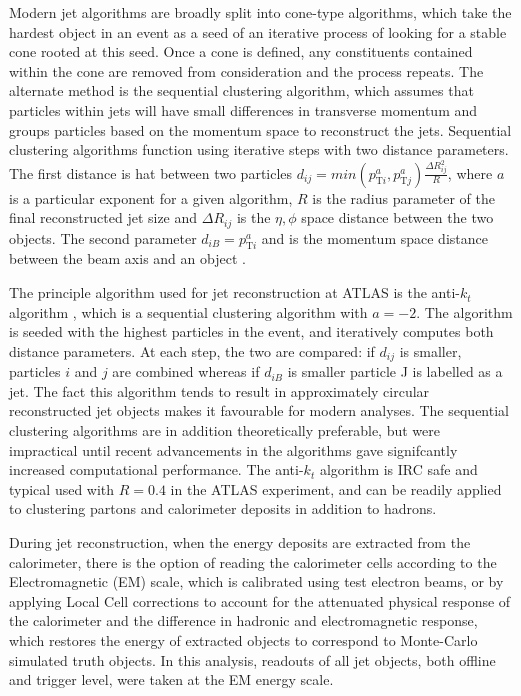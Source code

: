 	Modern jet algorithms are broadly split into cone-type algorithms, which take the hardest object in an event as a seed of an iterative process of looking for a stable cone rooted at this seed. Once a cone is defined, any constituents contained within the cone are removed from consideration and the process repeats. The alternate method is the sequential clustering algorithm, which assumes that particles within jets will have small differences in transverse momentum and groups particles based on the momentum space to reconstruct the jets. Sequential clustering algorithms function using iterative steps with two distance parameters. The first distance is hat between two particles $d_{ij} = min(p_{\text{T}i}^a, p_{\text{T}j}^a)\frac{\Delta R_{ij}^2}{R}$, where $a$ is a particular exponent for a given algorithm, $R$ is the radius parameter of the final reconstructed jet size and $\Delta R_{ij}$ is the $\eta, \phi$ space distance between the two objects. The second parameter $d_{iB} = p_{\text{T}i}^a$ and is the momentum space distance between the beam axis and an object \cite{jetreco}.

	The principle algorithm used for jet reconstruction at ATLAS is the anti-$k_t$ algorithm \cite{antikt}, which is a sequential clustering algorithm with $a=-2$. The algorithm is seeded with the highest \pt particles in the event, and iteratively computes both distance parameters. At each step, the two are compared: if $d_{ij}$ is smaller, particles $i$ and $j$ are combined whereas if $d_{iB}$ is smaller particle J is labelled as a jet. The fact this algorithm tends to result in approximately circular reconstructed jet objects makes it favourable for modern analyses. The sequential clustering algorithms are in addition theoretically preferable, but were impractical until recent advancements in the algorithms gave signifcantly increased computational performance. The anti-$k_t$ algorithm is IRC safe and typical used with $R=0.4$ in the ATLAS experiment, and can be readily applied to clustering partons and calorimeter deposits in addition to hadrons.

	During jet reconstruction, when the energy deposits are extracted from the calorimeter, there is the option of reading the calorimeter cells according to the Electromagnetic (EM) scale, which is calibrated using test electron beams, or by applying Local Cell corrections to account for the attenuated physical response of the calorimeter and the difference in hadronic and electromagnetic response, which restores the energy of extracted objects to correspond to Monte-Carlo simulated truth objects. In this analysis, readouts of all jet objects, both offline and trigger level, were taken at the EM energy scale.

